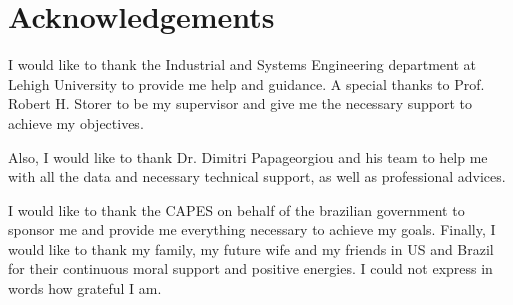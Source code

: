 \chapter*{Acknowledgements}

I would like to thank the Industrial and Systems Engineering department at Lehigh University to provide me help and guidance. A special thanks to Prof. Robert H. Storer to be my supervisor and give me the necessary support to achieve my objectives.

Also, I would like to thank Dr. Dimitri Papageorgiou and his team to help me with all the data and necessary technical support, as well as professional advices.

I would like to thank the CAPES on behalf of the brazilian government to sponsor me and provide me everything necessary to achieve my goals. Finally, I would like to thank my family, my future wife and my friends in US and Brazil for their continuous moral support and positive energies. I could not express in words how grateful I am.